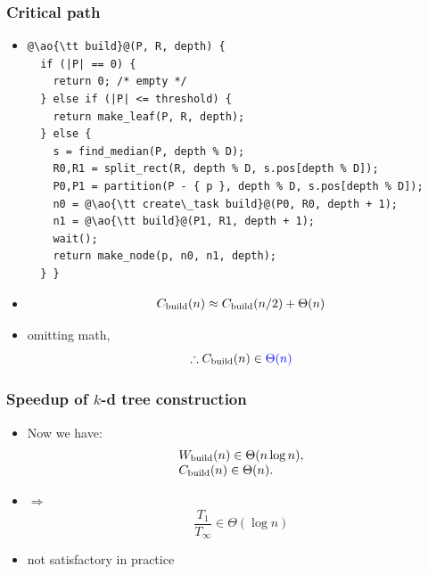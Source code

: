 \documentclass[12pt,dvipdfmx]{beamer}
\newcommand{\ao}[1]{{\color{blue}#1}}
\begin{document}
\begin{frame}[fragile]
\frametitle{Critical path}
\begin{itemize}
\item []
\begin{lstlisting}
@\ao{\tt build}@(P, R, depth) {
  if (|P| == 0) {
    return 0; /* empty */
  } else if (|P| <= threshold) {
    return make_leaf(P, R, depth);
  } else {
    s = find_median(P, depth % D);
    R0,R1 = split_rect(R, depth % D, s.pos[depth % D]);
    P0,P1 = partition(P - { p }, depth % D, s.pos[depth % D]);
    n0 = @\ao{\tt create\_task build}@(P0, R0, depth + 1);
    n1 = @\ao{\tt build}@(P1, R1, depth + 1);
    wait();
    return make_node(p, n0, n1, depth);
  } }
\end{lstlisting}

\item []
\[
\begin{array}{l}
C_{\mbox{\scriptsize build}}(n)
\approx C_{\mbox{\scriptsize build}}(n/2) + \Theta(n) \\
\end{array}
\]
\item [] omitting math,
\[ \therefore C_{\mbox{\scriptsize build}}(n) \in \ao{\Theta(n)} \]
\end{itemize}
\end{frame}


\begin{frame}
\frametitle{Speedup of $k$-d tree construction}
\begin{itemize}
\item Now we have:
\[ 
\begin{array}{l}
W_{\mbox{\scriptsize build}}(n) \in \Theta(n\log n), \\
C_{\mbox{\scriptsize build}}(n) \in \Theta(n).
\end{array}
\]

\item $\Rightarrow$ 
\[ \frac{T_1}{T_\infty} \in \Theta(\log n) \]

\item not satisfactory in practice
\end{itemize}
\end{frame}
\end{document}
